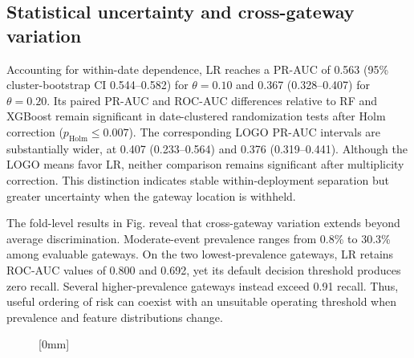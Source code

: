 \documentclass{jot}
\begin{document}
\subsection{Statistical uncertainty and cross-gateway variation}\label{s:4.6}

Accounting for within-date dependence, LR reaches a PR-AUC of 0.563 (95\% cluster-bootstrap CI 0.544--0.582) for $\theta=0.10$ and 0.367 (0.328--0.407) for $\theta=0.20$. Its paired PR-AUC and ROC-AUC differences relative to RF and XGBoost remain significant in date-clustered randomization tests after Holm correction ($p_{\mathrm{Holm}}\leq0.007$). The corresponding LOGO PR-AUC intervals are substantially wider, at 0.407 (0.233--0.564) and 0.376 (0.319--0.441). Although the LOGO means favor LR, neither comparison remains significant after multiplicity correction. This distinction indicates stable within-deployment separation but greater uncertainty when the gateway location is withheld.

The fold-level results in Fig.  reveal that cross-gateway variation extends beyond average discrimination. Moderate-event prevalence ranges from 0.8\% to 30.3\% among evaluable gateways. On the two lowest-prevalence gateways, LR retains ROC-AUC values of 0.800 and 0.692, yet its default decision threshold produces zero recall. Several higher-prevalence gateways instead exceed 0.91 recall. Thus, useful ordering of risk can coexist with an unsuitable operating threshold when prevalence and feature distributions change.

\begin{figure}[t]
[0mm]
\end{figure}
\end{document}
